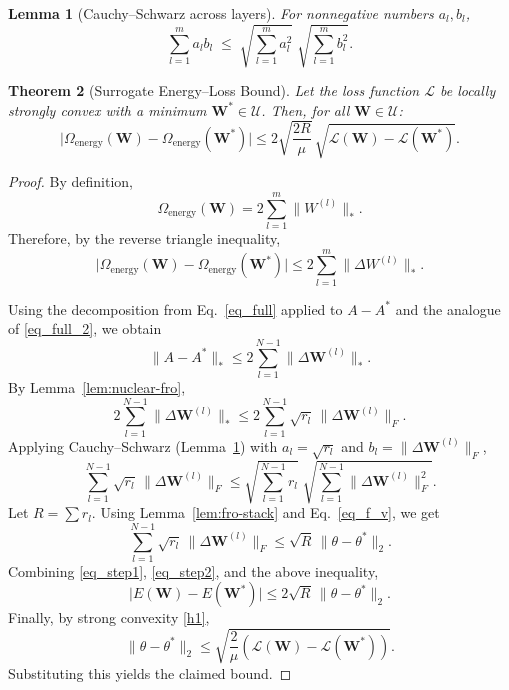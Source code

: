 \documentclass[a4paper,fleqn]{cas-sc}
\newtheorem{theorem}{Theorem}
\newtheorem{lemma}[theorem]{Lemma}
\theoremstyle{remark}
\theoremstyle{definition}
\begin{document}
\begin{lemma}[Cauchy--Schwarz across layers]\label{lem:cs-layers}
For nonnegative numbers $a_l,b_l$,
\[
\sum_{l=1}^m a_l b_l \;\le\; \sqrt{\sum_{l=1}^m a_l^2}\;\sqrt{\sum_{l=1}^m b_l^2}.
\]
\end{lemma}

\begin{theorem}[Surrogate Energy--Loss Bound]\label{thm:main}
Let the loss function $\mathcal{L}$ be locally strongly convex with a minimum $\bm{W}^*\in \mathcal{U}$. Then, for all $\bm{W}\in \mathcal{U}$:
\[
\bigl|\Omega_{\text{energy}}(\bm{W})-\Omega_{\text{energy}}(\bm{W}^*)\bigr|
\le
2\sqrt{\frac{2R}{\mu}}\,
\sqrt{\mathcal{L}(\bm{W})-\mathcal{L}(\bm{W}^*)}.
\]
\end{theorem}

\begin{proof}

By definition,
\[
\Omega_{\text{energy}}(\bm{W})=2\sum_{l=1}^{m}\|W^{(l)}\|_*.
\]
Therefore, by the reverse triangle inequality,
\[
\bigl|\Omega_{\text{energy}}(\bm{W})-\Omega_{\text{energy}}(\bm{W}^*)\bigr|
\le
2\sum_{l=1}^{m}\|\Delta W^{(l)}\|_*.
\]

Using the decomposition from Eq.~\eqref{eq_full} applied to $A - A^*$ and the analogue of \eqref{eq_full_2}, we obtain
\begin{equation}\label{eq_step1}
\|A - A^*\|_* \le 2 \sum_{l=1}^{N-1} \|\Delta \bm{W}^{(l)}\|_*.
\end{equation}
By Lemma~\ref{lem:nuclear-fro},
\begin{equation}\label{eq_step2}
2 \sum_{l=1}^{N-1} \|\Delta \bm{W}^{(l)}\|_* \le 2 \sum_{l=1}^{N-1} \sqrt{r_l} \, \|\Delta \bm{W}^{(l)}\|_F.
\end{equation}
Applying Cauchy--Schwarz (Lemma~\ref{lem:cs-layers}) with $a_l = \sqrt{r_l}$ and $b_l = \|\Delta \bm{W}^{(l)}\|_F$,
\begin{equation}\label{eq_step3}
\sum_{l=1}^{N-1} \sqrt{r_l} \, \|\Delta \bm{W}^{(l)}\|_F \le \sqrt{\sum_{l=1}^{N-1} r_l} \; \sqrt{\sum_{l=1}^{N-1} \|\Delta \bm{W}^{(l)}\|_F^2}.
\end{equation}
Let $R = \sum r_l$. Using Lemma~\ref{lem:fro-stack} and Eq.~\eqref{eq_f_v}, we get
\[
\sum_{l=1}^{N-1} \sqrt{r_l} \, \|\Delta \bm{W}^{(l)}\|_F \le \sqrt{R} \, \|\theta - \theta^*\|_2.
\]
Combining \eqref{eq_step1}, \eqref{eq_step2}, and the above inequality,
\begin{equation}
\bigl|E(\bm{W})-E(\bm{W}^*)\bigr| \le 2\sqrt{R} \, \|\theta - \theta^*\|_2.
\end{equation}
Finally, by strong convexity \eqref{h1},
\[
\|\theta - \theta^*\|_2 \le \sqrt{\frac{2}{\mu}\left(\mathcal{L}(\bm{W})-\mathcal{L}(\bm{W}^*)\right)}.
\]
Substituting this yields the claimed bound.
\end{proof}
\end{document}
